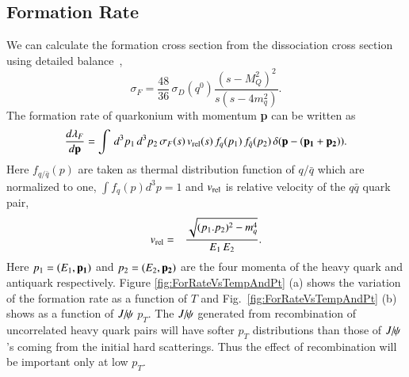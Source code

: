 \documentclass[review]{elsarticle}
\newcommand{\Jpsi}{\ensuremath{J\hspace{-.08em}/\hspace{-.14em}\psi}\xspace} %
\begin{document}
{  \subsection{Formation Rate}
  We can calculate the formation cross section from the dissociation cross section using detailed balance~\cite{Thews:2000rj,Thews:2005vj},
  \begin{equation}
    \sigma_{F} = \frac{48}{36}\,\sigma_{D}(q^0)\frac{(s-M_{Q}^2)^{2}}{s(s-4m_q^{2})}.
  \end{equation}
  The formation rate of quarkonium with momentum {\bf p} can be written as
  \begin{equation}
    \frac{d\lambda_{F}}{d{\rm\bf p}} = \int \,d^{3}p_1 \,d^{3}p_2 \,\sigma_{F}(s)\, v_{\rm rel}(s)\,f_{q}(p_1)\, f_{\bar{q}} (p_2)\,\delta({\rm\bf p}-( {\rm\bf p_1} + {\rm\bf p_2} )).
  \end{equation}
  Here $f_{q/\bar{q}}(p)$ are taken as thermal distribution function of  $q/\bar{q}$ which are 
  normalized to one, $\int f_{q}(p) d^{3}p  = 1 $ and $v_{\rm rel}$ is relative velocity of the
  $q\bar{q}$ quark pair,
  \begin{eqnarray}
    v_{\rm rel} &=& {\sqrt{(p_{1}.p_{2})^{2} - m_q^{4} } \over E_{1} \, E_{2}}. %
  \end{eqnarray}
  Here $p_1 = (E_1,{\bf p_{1}})$ and $p_{2} = (E_{2},{\bf p_{2}})$ are the four momenta of the heavy quark and 
  antiquark respectively.
  Figure \ref{fig:ForRateVsTempAndPt} (a) shows the variation of the formation rate as a function 
  of $T$ and Fig.~\ref{fig:ForRateVsTempAndPt} (b) shows as a function of $\Jpsi$ $p_T$.
  The $\Jpsi$ generated from recombination of uncorrelated heavy quark pairs will have 
  softer $p_{T}$ distributions than those of $\Jpsi$'s coming from the initial hard scatterings.
  Thus the effect of recombination will be important only at low $p_T$.
  
}
\end{document}
